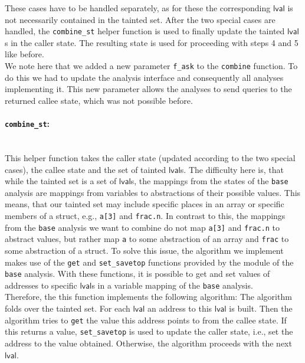       These cases have to be handled separately, as for these the corresponding $\textsf{lval}$ is not necessarily contained in the tainted set. After the two special cases are handled, the \texttt{combine\_st} helper function is used to finally update the tainted $\textsf{lval}$s in the caller state. The resulting state is used for proceeding with steps 4 and 5 like before.\\
      We note here that we added a new parameter \texttt{f\_ask} to the \texttt{combine} function. To do this we had to update the analysis interface and consequently all analyses implementing it. This new parameter allows the analyses to send queries to the returned callee state, which was not possible before.
      \paragraph{\texttt{combine\_st}:}\mbox{}\\
      This helper function takes the caller state (updated according to the two special cases), the callee state and the set of tainted $\textsf{lval}$s. The difficulty here is, that while the tainted set is a set of $\textsf{lval}$s, the mappings from the states of the \texttt{base} analysis are mappings from variables to abstractions of their possible values. This means, that our tainted set may include specific places in an array or specific members of a struct, e.g., \texttt{a[3]} and \texttt{frac.n}. In contrast to this, the mappings from the \texttt{base} analysis we want to combine do not map \texttt{a[3]} and \texttt{frac.n} to abstract values, but rather map \texttt{a} to some abstraction of an array and \texttt{frac} to some abstraction of a struct. To solve this issue, the algorithm we implement makes use of the \texttt{get} and \texttt{set\_savetop} functions provided by the module of the \texttt{base} analysis. With these functions, it is possible to get and set values of addresses to specific $\textsf{lval}$s in a variable mapping of the \texttt{base} analysis.\\
      Therefore, the this function implements the following algorithm: The algorithm folds over the tainted set. For each $\textsf{lval}$ an address to this $\textsf{lval}$ is built. Then the algorithm tries to \texttt{get} the value this address points to from the callee state. If this returns a value, \texttt{set\_savetop} is used to update the caller state, i.e., set the address to the value obtained. Otherwise, the algorithm proceeds with the next $\textsf{lval}$.\\

